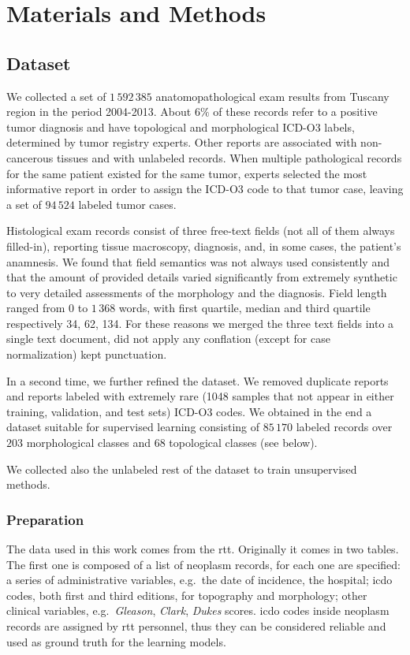 \chapter{Materials and Methods}

\section{Dataset}
\label{sec:dataset}
We collected a set of $1\,592\,385$ anatomopathological exam results
from Tuscany region in the period 2004-2013. About $6\%$
of these records refer to a positive tumor
diagnosis and have topological and morphological ICD-O3 labels,
determined by tumor registry experts. Other reports are associated
with non-cancerous tissues and with unlabeled records. When multiple
pathological records for the
same patient existed for the same tumor, experts selected the most
informative report in order to assign the ICD-O3 code to that tumor
case, leaving a set of $94\,524$ labeled tumor cases.

Histological exam records consist of three free-text fields (not all
of them always filled-in), reporting tissue macroscopy, diagnosis,
and, in some cases, the patient's anamnesis. We found that field
semantics was not always used consistently and that the amount of
provided details varied significantly from extremely synthetic to very
detailed assessments of the morphology and the diagnosis. Field length
ranged from $0$ to $1\,368$ words, with first quartile, median and
third quartile respectively 34, 62, 134. For these reasons we merged
the three text fields
into a single text document, did not apply any conflation (except for
case normalization) kept punctuation.


In a second time, we further refined the dataset. We removed duplicate
reports and reports labeled with extremely rare (1048
samples that not
appear in either training, validation, and test sets) ICD-O3 codes. We
obtained in the end 
a dataset suitable for supervised learning consisting of $85\,170$
labeled records over $203$ morphological classes and $68$
topological classes (see below).

We collected also the unlabeled rest of the dataset to train
unsupervised methods.

\subsection{Preparation}
The data used in this work comes from the \ac{rtt}. Originally it
comes in two tables. The first one is composed of
a list of
neoplasm records, for each one are specified: a series of
administrative variables, e.g.\ the date of incidence, the hospital;
\ac{icdo} codes, both first and third editions, for topography and
morphology; other clinical variables, e.g.\ \emph{Gleason},
\emph{Clark}, \emph{Dukes} scores.
\ac{icdo} codes inside neoplasm records are assigned by
\ac{rtt} personnel, thus they can be considered reliable and used as
ground truth for the learning models.

